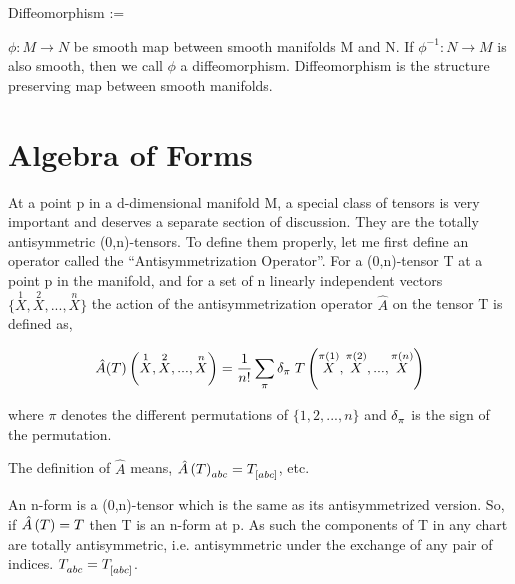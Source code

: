 \begin{definition}
    Diffeomorphism :=

    $ \phi: M \longrightarrow N$ be smooth map between smooth manifolds M and N. If $ \phi^{-1}: N \longrightarrow M$ is also smooth, then we call $ \phi$ a diffeomorphism. Diffeomorphism is the structure preserving map between smooth manifolds.
\end{definition}












\section{Algebra of Forms}








At a point p in a d-dimensional manifold M, a special class of tensors is very important and deserves a separate section of discussion. They are the totally antisymmetric (0,n)-tensors. To define them properly, let me first define an operator called the ``Antisymmetrization Operator''. For a (0,n)-tensor T at a point p in the manifold, and for a set of n linearly independent vectors $ \{ \overset{1}{X}, \overset{2}{X},...,\overset{n}{X}\}$ the action of the antisymmetrization operator $ \hat{A}$ on the tensor T is defined as,

\begin{align*}
    \hat{A}(T)\left( \overset{1}{X}, \overset{2}{X},...,\overset{n}{X} \right) &= \frac{1}{n!} \sum_{ \pi} \delta_\pi \; T \left( \overset{ \pi(1)}{X}, \overset{\pi(2)}{X},...,\overset{\pi(n)}{X} \right) \\
\end{align*}

where $ \pi$ denotes the different permutations of $ \{ 1,2,...,n \}$ and $ \tt{ \delta}{}{ \pi}$ is the sign of the permutation. 


The definition of $ \hat{A}$ means, $ \tt{\hat{A} \lera{T}}{}{abc} = \tt{T}{}{\left[abc\right]}$, etc. 

An n-form is a (0,n)-tensor which is the same as its antisymmetrized version. So, if $ \hat{A} \left( T \right)= T$ then T is an n-form at p. As such the components of T in any chart are totally antisymmetric, i.e. antisymmetric under the exchange of any pair of indices. $ \tt{T}{}{abc}= \tt{T}{}{[abc]}$.

